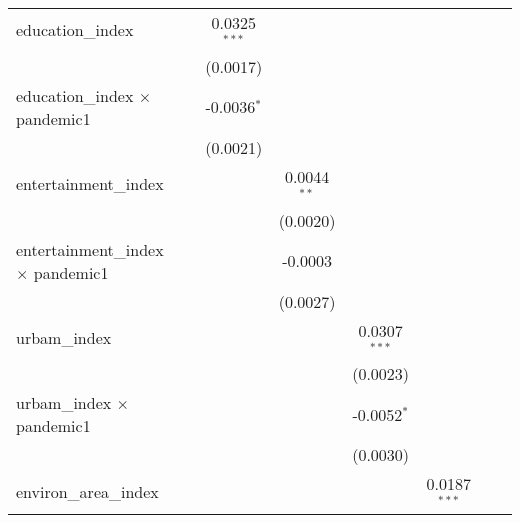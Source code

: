 \begin{table}[htbp]
\begin{tabular}{lccccccc}
      education\_index                           &                & 0.0325$^{***}$ &                &                &                &                 &   \\   
                                                 &                & (0.0017)       &                &                &                &                 &   \\   
      education\_index $\times$ pandemic1        &                & -0.0036$^{*}$  &                &                &                &                 &   \\   
                                                 &                & (0.0021)       &                &                &                &                 &   \\   
      entertainment\_index                       &                &                & 0.0044$^{**}$  &                &                &                 &   \\   
                                                 &                &                & (0.0020)       &                &                &                 &   \\   
      entertainment\_index $\times$ pandemic1    &                &                & -0.0003        &                &                &                 &   \\   
                                                 &                &                & (0.0027)       &                &                &                 &   \\   
      urbam\_index                               &                &                &                & 0.0307$^{***}$ &                &                 &   \\   
                                                 &                &                &                & (0.0023)       &                &                 &   \\   
      urbam\_index $\times$ pandemic1            &                &                &                & -0.0052$^{*}$  &                &                 &   \\   
                                                 &                &                &                & (0.0030)       &                &                 &   \\   
      environ\_area\_index                       &                &                &                &                & 0.0187$^{***}$ &                 &   \\   

\end{tabular}
\end{table}
